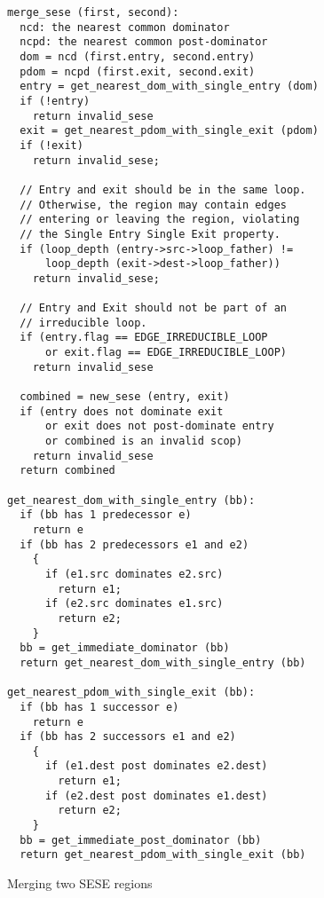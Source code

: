 \documentclass{sigplanconf}
\begin{document}
\begin{figure}
\begin{verbatim}
merge_sese (first, second):
  ncd: the nearest common dominator
  ncpd: the nearest common post-dominator
  dom = ncd (first.entry, second.entry)
  pdom = ncpd (first.exit, second.exit)
  entry = get_nearest_dom_with_single_entry (dom)
  if (!entry)
    return invalid_sese
  exit = get_nearest_pdom_with_single_exit (pdom)
  if (!exit)
    return invalid_sese;

  // Entry and exit should be in the same loop.
  // Otherwise, the region may contain edges
  // entering or leaving the region, violating
  // the Single Entry Single Exit property.
  if (loop_depth (entry->src->loop_father) !=
      loop_depth (exit->dest->loop_father))
    return invalid_sese;

  // Entry and Exit should not be part of an
  // irreducible loop.
  if (entry.flag == EDGE_IRREDUCIBLE_LOOP
      or exit.flag == EDGE_IRREDUCIBLE_LOOP)
    return invalid_sese

  combined = new_sese (entry, exit)
  if (entry does not dominate exit
      or exit does not post-dominate entry
      or combined is an invalid scop)
    return invalid_sese
  return combined

get_nearest_dom_with_single_entry (bb):
  if (bb has 1 predecessor e)
    return e
  if (bb has 2 predecessors e1 and e2)
    {
      if (e1.src dominates e2.src)
        return e1;
      if (e2.src dominates e1.src)
        return e2;
    }
  bb = get_immediate_dominator (bb)
  return get_nearest_dom_with_single_entry (bb)

get_nearest_pdom_with_single_exit (bb):
  if (bb has 1 successor e)
    return e
  if (bb has 2 successors e1 and e2)
    {
      if (e1.dest post dominates e2.dest)
        return e1;
      if (e2.dest post dominates e1.dest)
        return e2;
    }
  bb = get_immediate_post_dominator (bb)
  return get_nearest_pdom_with_single_exit (bb)

\end{verbatim}
\caption{Merging two SESE regions}
\label{fig:merge-sese}
\end{figure}


\end{document}
